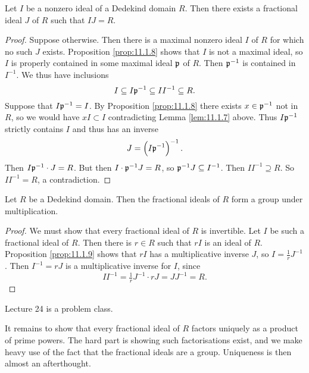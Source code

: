 \begin{proposition}
\label{prop:11.1.9}
Let $ I $ be a nonzero ideal of a Dedekind domain $ R $. Then there exists a fractional ideal $ J $ of $ R $ such that $ IJ = R $.
\end{proposition}

\begin{proof}
Suppose otherwise. Then there is a maximal nonzero ideal $ I $ of $ R $ for which no such $ J $ exists. Proposition \ref{prop:11.1.8} shows that $ I $ is not a maximal ideal, so $ I $ is properly contained in some maximal ideal $ \mathfrak{p} $ of $ R $. Then $ \mathfrak{p}^{-1} $ is contained in $ I^{-1} $. We thus have inclusions
$$ I \subseteq I\mathfrak{p}^{-1} \subseteq II^{-1} \subseteq R. $$
Suppose that $ I\mathfrak{p}^{-1} = I $. By Proposition \ref{prop:11.1.8} there exists $ x \in \mathfrak{p}^{-1} $ not in $ R $, so we would have $ xI \subset I $ contradicting Lemma \ref{lem:11.1.7} above. Thus $ I\mathfrak{p}^{-1} $ strictly contains $ I $ and thus has an inverse
$$ J = \br{I\pp^{-1}}^{-1}. $$
Then $ I\mathfrak{p}^{-1} \cdot J = R $. But then $ I \cdot \mathfrak{p}^{-1}J = R $, so $ \mathfrak{p}^{-1}J \subseteq I^{-1} $. Then $ II^{-1} \supseteq R $. So $ II^{-1} = R $, a contradiction.
\end{proof}

\begin{theorem}
Let $ R $ be a Dedekind domain. Then the fractional ideals of $ R $ form a group under multiplication.
\end{theorem}

\begin{proof}
We must show that every fractional ideal of $ R $ is invertible. Let $ I $ be such a fractional ideal of $ R $. Then there is $ r \in R $ such that $ rI $ is an ideal of $ R $. Proposition \ref{prop:11.1.9} shows that $ rI $ has a multiplicative inverse $ J $, so $ I = \tfrac{1}{r}J^{-1} $. Then $ I^{-1} = rJ $ is a multiplicative inverse for $ I $, since
$$ II^{-1} = \tfrac{1}{r}J^{-1} \cdot rJ = JJ^{-1} = R. $$
\end{proof}


Lecture 24 is a problem class.

\pagebreak


It remains to show that every fractional ideal of $ R $ factors uniquely as a product of prime powers. The hard part is showing such factorisations exist, and we make heavy use of the fact that the fractional ideals are a group. Uniqueness is then almost an afterthought.

